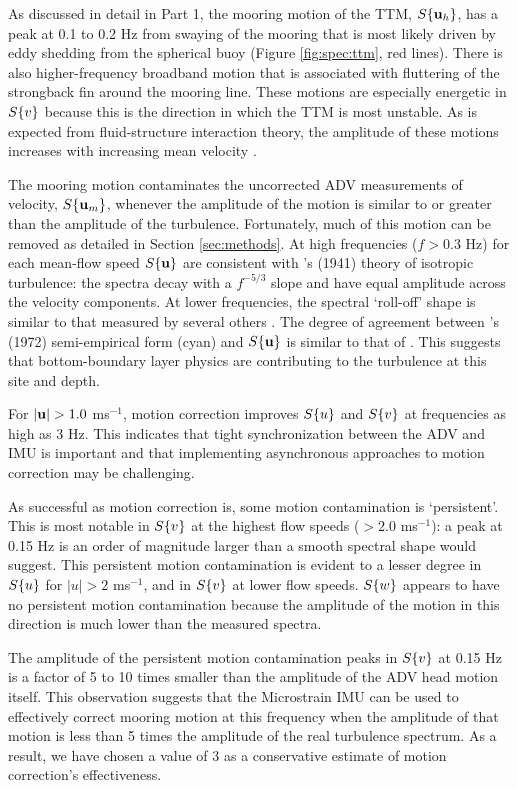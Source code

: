 As discussed in detail in Part 1, the mooring motion of the TTM, $S\{\mathbf{u}_{h}\}$, has a peak at 0.1 to 0.2 Hz from swaying of the mooring that is most likely driven by eddy shedding from the spherical buoy (Figure \ref{fig:spec:ttm}, red lines). There is also higher-frequency broadband motion that is associated with fluttering of the strongback fin around the mooring line. These motions are especially energetic in $S\{v\}$ because this is the direction in which the TTM is most unstable. As is expected from fluid-structure interaction theory, the amplitude of these motions increases with increasing mean velocity \cite[]{Morison++1950}.

The mooring motion contaminates the uncorrected ADV measurements of velocity, $S\{\mathbf{u}_{m}\}$, whenever the amplitude of the motion is similar to or greater than the amplitude of the turbulence. Fortunately, much of this motion can be removed as detailed in Section \ref{sec:methods}. At high frequencies ($f>0.3$ Hz) for each mean-flow speed $S\{\mathbf{u}\}$ are consistent with \citeauthor{Kolmogorov1941c}'s (1941) theory of isotropic turbulence: the spectra decay with a $f^{-5/3}$ slope and have equal amplitude across the velocity components. At lower frequencies, the spectral `roll-off' shape is similar to that measured by several others \cite[e.g.,][]{Thomson++2012, McMillan++2016}. The degree of agreement between \citeauthor{Kaimal++1972}'s (1972) semi-empirical form (cyan) and $S\{\mathbf{u}\}$ is similar to that of \cite{Walter++2011}. This suggests that bottom-boundary layer physics are contributing to the turbulence at this site and depth.

For $|\ue|>1.0$ ms$^{-1}$, motion correction improves $S\{u\}$ and $S\{v\}$ at frequencies as high as 3 Hz. This indicates that tight synchronization between the ADV and IMU is important and that implementing asynchronous approaches to motion correction may be challenging.

As successful as motion correction is, some motion contamination is `persistent'. This is most notable in $S\{v\}$ at the highest flow speeds ($>2.0$ ms$^{-1}$): a peak at 0.15 Hz is an order of magnitude larger than a smooth spectral shape would suggest. This persistent motion contamination is evident to a lesser degree in $S\{u\}$ for $|u|>2$ ms$^{-1}$, and in $S\{v\}$ at lower flow speeds.  $S\{w\}$ appears to have no persistent motion contamination because the amplitude of the motion in this direction is much lower than the measured spectra.

The amplitude of the persistent motion contamination peaks in $S\{v\}$ at 0.15 Hz is a factor of 5 to 10 times smaller than the amplitude of the ADV head motion itself. This observation suggests that the Microstrain IMU can be used to effectively correct mooring motion at this frequency when the amplitude of that motion is less than 5 times the amplitude of the real turbulence spectrum. As a result, we have chosen a value of 3 as a conservative estimate of motion correction's effectiveness.

